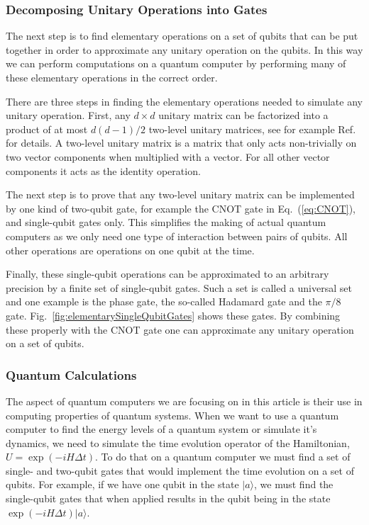 \subsubsection{Decomposing Unitary Operations into Gates}
The next step is to find elementary operations
on a set of qubits that can be put together in order to approximate any unitary
operation on the qubits. In this way we can perform computations on
a quantum computer by performing many of these elementary operations
in the correct order.

There are three steps in finding the elementary operations needed to
simulate any unitary operation.
First,  any
$d\times d$ unitary matrix can be factorized into a product of at most
$d(d-1)/2$ two-level unitary matrices, see for example Ref.~\cite{nielsen2000} for details. 
A two-level unitary matrix is a
matrix that only acts non-trivially on two vector components when
multiplied with a vector. For all other vector components it acts as
the identity operation. 

The next step is to prove that any two-level unitary matrix can be
implemented by one kind of two-qubit gate, for example the CNOT gate 
in Eq.~(\ref{eq:CNOT}), 
and single-qubit gates only. 
This simplifies the making of actual quantum
computers as we only need one type of interaction between pairs of
qubits. All other operations are operations on one qubit at the time. 

Finally,  these single-qubit operations can be approximated to an
arbitrary precision by a finite set of single-qubit gates. Such a set
is called a universal set and one example is the phase gate, the
so-called Hadamard gate and
the $\pi/8$ gate. Fig.~\ref{fig:elementarySingleQubitGates} shows these gates. 
By combining these properly 
with the CNOT gate one can approximate any unitary operation on a set
of qubits. 

\subsubsection{Quantum Calculations}
The aspect of quantum computers we are focusing on in this article is
their use in computing properties of quantum systems. 
When we want to use a quantum computer to 
find the energy levels of a quantum system
or simulate it's dynamics, we need to simulate
the time evolution operator of the Hamiltonian, $U=\exp(-iH\Delta t)$.
To do that on a quantum computer we must find a set of single- and 
two-qubit gates that would implement the time evolution on a set of
qubits. For example, if we have one qubit in the state ${\ensuremath{|
    a\rangle}}$, we must find the single-qubit gates that when applied
results in the qubit being in the state
$\exp(-iH\Delta t)|a\rangle$. 

